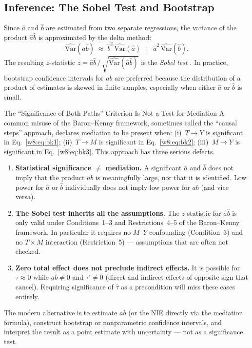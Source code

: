 \documentclass[master.tex]{subfiles}
\begin{document}
\subsection{Inference: The Sobel Test and Bootstrap}

Since $\hat a$ and $\hat b$ are estimated from two separate regressions,
the variance of the product $\hat a \hat b$ is approximated by the
delta method:
\begin{equation}
  \widehat{\mathrm{Var}}(\hat a \hat b)
  \;\approx\;
  \hat b^2\, \widehat{\mathrm{Var}}(\hat a)
  \;+\;
  \hat a^2\, \widehat{\mathrm{Var}}(\hat b).
  \label{w8:eq:sobel}
\end{equation}
The resulting $z$-statistic $z = \hat a \hat b \,/\,
\sqrt{\widehat{\mathrm{Var}}(\hat a \hat b)}$ is the \emph{Sobel test}
\citep{sobel1982asymptotic}.  In practice, bootstrap confidence
intervals for $ab$ are preferred because the distribution of a product
of estimates is skewed in finite samples, especially when either
$\hat a$ or $\hat b$ is small.

\begin{warn}{The ``Significance of Both Paths'' Criterion Is Not a
  Test for Mediation}
\label{w8:warn:sobel}
A common misuse of the Baron--Kenny framework, sometimes called the
``causal steps'' approach, declares mediation to be present when:
(i)~$T \to Y$ is significant in Eq.~\eqref{w8:eq:bk1}; (ii)~$T \to M$
is significant in Eq.~\eqref{w8:eq:bk2}; (iii)~$M \to Y$ is
significant in Eq.~\eqref{w8:eq:bk3}.  This approach has three serious
defects.
\begin{enumerate}
  \item \textbf{Statistical significance $\neq$ mediation.}  A
    significant $\hat a$ and $\hat b$ does not imply that the
    product $ab$ is meaningfully large, nor that it is identified.
    Low power for $\hat a$ or $\hat b$ individually does not imply low
    power for $ab$ (and vice versa).
  \item \textbf{The Sobel test inherits all the assumptions.}  The
    $z$-statistic for $\hat a \hat b$ is only valid under
    Conditions~1--3 and Restrictions~4--5 of the Baron--Kenny
    framework.  In particular it requires no $M$--$Y$ confounding
    (Condition~3) and no $T \times M$ interaction
    (Restriction~5) --- assumptions that are often not checked.
  \item \textbf{Zero total effect does not preclude indirect effects.}
    It is possible for $\tau \approx 0$ while $ab \neq 0$ and
    $\tau' \neq 0$ (direct and indirect effects of opposite sign that
    cancel).  Requiring significance of $\hat\tau$ as a precondition
    will miss these cases entirely.
\end{enumerate}
The modern alternative is to estimate $ab$ (or the NIE directly via
the mediation formula), construct bootstrap or nonparametric confidence
intervals, and interpret the result as a point estimate with
uncertainty --- not as a significance test.
\end{warn}
\end{document}
